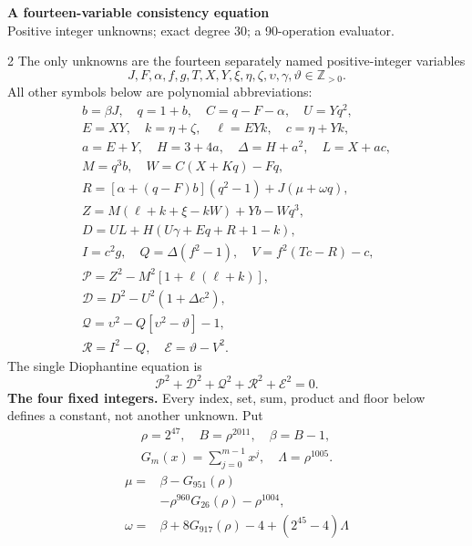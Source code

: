 \documentclass[10pt]{article}
\begin{document}
\begin{center}
{\large\bfseries A fourteen-variable consistency equation}\\[-1pt]
{\small Positive integer unknowns; exact degree 30; a 90-operation evaluator.}
\end{center}\vspace{-8pt}
\begin{multicols}{2}
\fontsize{8.6}{9.1}\selectfont
The only unknowns are the fourteen separately named positive-integer variables
\[
J,F,\alpha,f,g,T,X,Y,\xi,\eta,\zeta,\upsilon,\gamma,\vartheta\in\mathbb Z_{>0}.
\]
All other symbols below are polynomial abbreviations:
\[
\begin{gathered}
b=\beta J,\quad q=1+b,\quad C=q-F-\alpha,\quad U=Yq^2,\\
E=XY,\quad k=\eta+\zeta,\quad \ell=EYk,\quad c=\eta+Yk,\\
a=E+Y,\quad H=3+4a,\quad\Delta=H+a^2,\quad L=X+ac,\\
M=q^3b,\quad W=C(X+Kq)-Fq,\\
R=[\alpha+(q-F)b](q^2-1)+J(\mu+\omega q),\\
Z=M(\ell+k+\xi-kW)+Yb-Wq^3,\\
D=UL+H(U\gamma+Eq+R+1-k),\\
I=c^2g,\quad Q=\Delta(f^2-1),\quad V=f^2(Tc-R)-c,\\
\mathcal{P}=Z^2-M^2[1+\ell(\ell+k)],\\
\mathcal{D}=D^2-U^2(1+\Delta c^2),\\
\mathcal{Q}=\upsilon^2-Q[\upsilon^2-\vartheta]-1,\\
\mathcal{R}=I^2-Q,\quad \mathcal{E}=\vartheta-V^2.
\end{gathered}
\]
The single Diophantine equation is
\[
\boxed{\mathcal{P}^2+\mathcal{D}^2+\mathcal{Q}^2+\mathcal{R}^2+\mathcal{E}^2=0.}
\]
\textbf{The four fixed integers.}
Every index, set, sum, product and floor below defines a constant, not
another unknown. Put
\[
\begin{gathered}
\rho=2^{47},\quad B=\rho^{2011},\quad\beta=B-1,\\
G_m(x)=\sum_{j=0}^{m-1}x^j,\quad
\Lambda=\rho^{1005}.
\end{gathered}
\]
\begin{align*}
\mu={}&\beta-G_{951}(\rho)\\
&-\rho^{960}G_{26}(\rho)-\rho^{1004},\\
\omega={}&\beta+8G_{917}(\rho)-4+(2^{45}-4)\Lambda\\

\end{align*}
\end{multicols}
\end{document}
